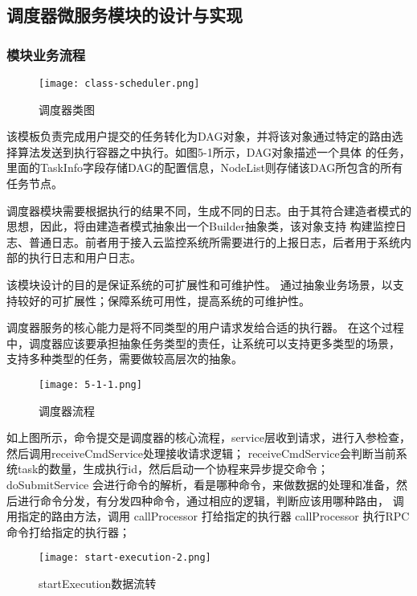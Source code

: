 \subsection{调度器微服务模块的设计与实现}


\subsubsection{模块业务流程}

\begin{figure}[H]
    \centering
    \texttt{[image: class-scheduler.png]}
    \caption{调度器类图}
    \label{fig:ddqlt}
\end{figure}
该模板负责完成用户提交的任务转化为DAG对象，并将该对象通过特定的路由选择算法发送到执行容器之中执行。如图5-1所示，DAG对象描述一个具体
的任务，里面的TaskInfo字段存储DAG的配置信息，NodeList则存储该DAG所包含的所有任务节点。

调度器模块需要根据执行的结果不同，生成不同的日志。由于其符合建造者模式的思想，因此，将由建造者模式抽象出一个Builder抽象类，该对象支持
构建监控日志、普通日志。前者用于接入云监控系统所需要进行的上报日志，后者用于系统内部的执行日志和用户日志。


该模块设计的目的是保证系统的可扩展性和可维护性。 通过抽象业务场景，以支持较好的可扩展性；保障系统可用性，提高系统的可维护性。

调度器服务的核心能力是将不同类型的用户请求发给合适的执行器。 在这个过程中，调度器应该要承担抽象任务类型的责任，让系统可以支持更多类型的场景，
支持多种类型的任务，需要做较高层次的抽象。


\begin{figure}[H]
    \centering
    \texttt{[image: 5-1-1.png]}
    \caption{调度器流程}
    \label{fig:调度器流程}
\end{figure}

如上图所示，命令提交是调度器的核心流程，service层收到请求，进行入参检查，然后调用receiveCmdService处理接收请求逻辑；
receiveCmdService会判断当前系统task的数量，生成执行id，然后启动一个协程来异步提交命令；
doSubmitService 会进行命令的解析，看是哪种命令，来做数据的处理和准备，然后进行命令分发，有分发四种命令，通过相应的逻辑，判断应该用哪种路由，
调用指定的路由方法，调用 callProcessor 打给指定的执行器
callProcessor 执行RPC命令打给指定的执行器；


\begin{figure}[H]
    \centering
    \texttt{[image: start-execution-2.png]}
    \caption{startExecution数据流转}
    \label{fig:startExecution数据流转}
    \note{}
\end{figure}


